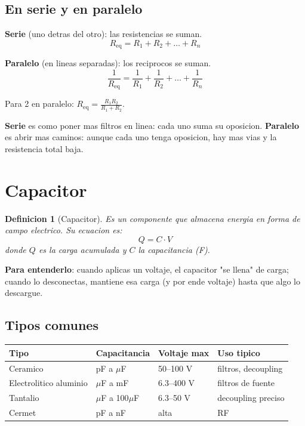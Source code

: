 \documentclass[11pt,a4paper,oneside,openright]{book}
\newtheorem{definicion}{Definicion}[chapter]
\begin{document}
\subsection{En serie y en paralelo}

\textbf{Serie} (uno detras del otro): las resistencias se suman.
\begin{equation}
R_{\text{eq}} = R_1 + R_2 + \dots + R_n
\end{equation}

\textbf{Paralelo} (en lineas separadas): los reciprocos se suman.
\begin{equation}
\frac{1}{R_{\text{eq}}} = \frac{1}{R_1} + \frac{1}{R_2} + \dots + \frac{1}{R_n}
\end{equation}

Para 2 en paralelo: $R_{\text{eq}} = \frac{R_1 R_2}{R_1 + R_2}$.

\begin{intuibox}
\textbf{Serie} es como poner mas filtros en linea: cada uno suma su
oposicion. \textbf{Paralelo} es abrir mas caminos: aunque cada uno tenga
oposicion, hay mas vias y la resistencia total baja.
\end{intuibox}

\section{Capacitor}

\begin{definicion}[Capacitor]
Es un componente que almacena energia en forma de campo electrico. Su
ecuacion es:
\begin{equation}
Q = C \cdot V
\end{equation}
donde $Q$ es la carga acumulada y $C$ la capacitancia (F).
\end{definicion}

\textbf{Para entenderlo}: cuando aplicas un voltaje, el capacitor "se llena"
de carga; cuando lo desconectas, mantiene esa carga (y por ende voltaje)
hasta que algo lo descargue.

\subsection{Tipos comunes}

\begin{center}
\begin{tabular}{llll}
\toprule
\textbf{Tipo} & \textbf{Capacitancia} & \textbf{Voltaje max} & \textbf{Uso tipico} \\
\midrule
Ceramico               & pF a $\mu$F   & 50--100 V & filtros, decoupling \\
Electrolitico aluminio & $\mu$F a mF   & 6.3--400 V & filtros de fuente \\
Tantalio               & $\mu$F a 100$\mu$F & 6.3--50 V & decoupling preciso \\
Cermet                 & pF a nF       & alta       & RF \\
\bottomrule
\end{tabular}
\end{center}
\end{document}
